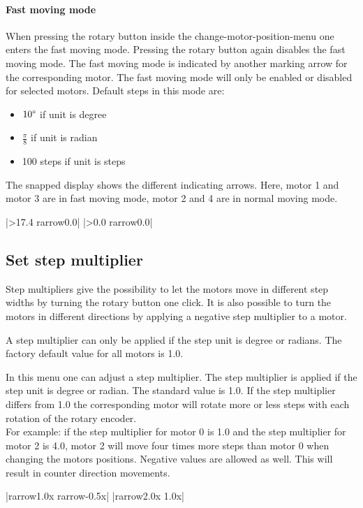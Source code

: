 \paragraph{Fast moving mode}
When pressing the rotary button inside the change-motor-position-menu one
enters the fast moving mode. Pressing the rotary button again disables the
fast moving mode. The fast moving mode is indicated by another marking arrow
for the corresponding motor. The fast moving mode will only be enabled or
disabled for selected motors.
Default steps in this mode are:
\begin{itemize}
  \item $10\degree$ if unit is degree
  \item $\frac{\pi}{8}$ if unit is radian
  \item 100 steps if unit is steps
\end{itemize}
The snapped display shows the different indicating arrows. Here, motor 1
and motor 3 are in fast moving mode, motor 2 and 4 are in normal moving mode.
\begin{center}
  |>17.4  {rarrow}0.0|
             |>0.0   {rarrow}0.0|
\end{center}


\subsection{Set step multiplier}
Step multipliers give the possibility to let the motors move in different
step widths by turning the rotary button one click. It is also possible
to turn the motors in different directions by applying a negative step
multiplier to a motor.

A step multiplier can only be applied if the step unit is degree or radians.
The factory default value for all motors is 1.0.

In this menu one can adjust a step multiplier. The step multiplier is
applied if the step unit is degree or radian. The standard value is 1.0.
If the step multiplier differs from 1.0 the corresponding motor will
rotate more or less steps with each rotation of the rotary encoder.\\
For example: if the step multiplier for motor 0 is 1.0 and the step
multiplier for motor 2 is 4.0, motor 2 will move four times more steps
than motor 0 when changing the motors positions. Negative values are
allowed as well. This will result in counter direction movements.
\begin{center}
  |{rarrow}1.0x   {rarrow}-0.5x|
             |{rarrow}2.0x    1.0x|
\end{center}

